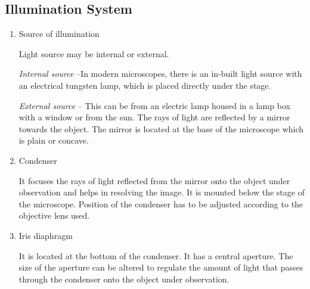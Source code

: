 \documentclass[a4paper,12pt,openany,twoside]{book}
\begin{document}
		\subsection*{Illumination System}
		\begin{enumerate}

			\item{Source of illumination \newline
				\par Light source may be internal or external.
				\par \textit{Internal source} –In modern microscopes, there is an in-built light source with an electrical tungsten lamp, which is placed directly under the stage.
				\par \textit{External source} – This can be from an electric lamp housed in a lamp box with a window or from the sun. The rays of light are reflected by a mirror towards the object. The mirror is located at the base of the microscope which is plain or concave.}
			\item{Condenser
				\par It focuses the rays of light reflected from the mirror onto the object under observation and helps in resolving the image. It is mounted below the stage of the microscope. Position of the condenser has to be adjusted according to the objective lens used.}
			\item{Iris diaphragm
				\par It is located at the bottom of the condenser. It has a central aperture. The size of the aperture can be altered to regulate the amount of light that passes through the condenser onto the object under observation.}
		\end{enumerate}
\end{document}
